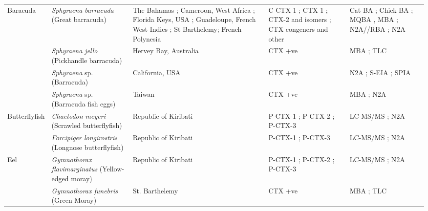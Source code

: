 \documentclass[12pt]{article}
\begin{document}
\begin{longtable}[l]{ | p{2cm} | p{3cm} | p{4.5cm} | p{2cm} | p{3cm} | }
	\hline
	Baracuda & \emph{Sphyraena barracuda} (Great barracuda) & The Bahamas \cite{o2012linking}; Cameroon, West Africa \cite{bienfang2008ciguatera}; Florida Keys, USA \cite{dechraoui2005use}; Guadeloupe, French West Indies \cite{pottier2003identification,pottier2001ciguatera}; St Barthelemy\cite{pottier2001ciguatera,vernoux1986heterogeneity}; French Polynesia \cite{bagnis1987use,chinain2014mail} & C-CTX-1 \cite{dechraoui2005use,pottier2003identification}; CTX-1 \cite{pottier2003identification}; CTX-2 and isomers \cite{pottier2003identification}; CTX congeners and other \cite{pottier2003identification}& Cat BA \cite{bagnis1987use}; Chick BA \cite{pottier2001ciguatera}; MQBA \cite{bagnis1987use}, MBA \cite{bagnis1987use,pottier2002characterisation,pottier2003identification}; N2A//RBA \cite{chinain2014mail}; N2A \cite{o2012linking} \\
	& \emph{Sphyraena jello} (Pickhandle barracuda) & Hervey Bay, Australia \cite{lewis1984ciguatoxin} & CTX +ve \cite{lewis1984ciguatoxin} & MBA \cite{lewis1984ciguatoxin}; TLC \cite{lewis1984ciguatoxin} \\
	& \emph{Sphyraena} sp. (Barracuda) & California, USA \cite{hokama1990simplified} & CTX +ve \cite{hokama1990simplified} & N2A \cite{hokama1990simplified}; S-EIA \cite{hokama1990simplified}; SPIA \cite{hokama1990simplified} \\
	& \emph{Sphyraena} sp. (Barracuda fish eggs) & Taiwan \cite{hung2005persistent} & CTX +ve \cite{hung2005persistent} & MBA \cite{hung2005persistent}; N2A \cite{hung2005persistent} \\
	\hline
	Butterflyfish & \emph{Chaetodon meyeri} (Scrawled butterflyfish) & Republic of Kiribati \cite{mak2013pacific} & P-CTX-1 \cite{mak2013pacific}; P-CTX-2 \cite{mak2013pacific}; P-CTX-3 \cite{mak2013pacific} & LC-MS/MS \cite{mak2013pacific}; N2A \cite{mak2013pacific} \\
	 & \emph{Forcipiger longirostris} (Longnose butterflyfish) & Republic of Kiribati \cite{mak2013pacific} & P-CTX-1 \cite{mak2013pacific}; P-CTX-3 \cite{mak2013pacific} & LC-MS/MS \cite{mak2013pacific}; N2A \cite{mak2013pacific} \\
	 \hline
	Eel & \emph{Gymnothorax flavimarginatus} (Yellow-edged moray) & Republic of Kiribati \cite{mak2013pacific} & P-CTX-1 \cite{mak2013pacific}; P-CTX-2 \cite{mak2013pacific}; P-CTX-3 \cite{mak2013pacific} & LC-MS/MS \cite{mak2013pacific}; N2A \cite{mak2013pacific} \\
	& \emph{Gymnothorax funebris} (Green Moray) & St. Barthelemy \cite{vernoux1986heterogeneity} & CTX +ve \cite{vernoux1986heterogeneity} & MBA \cite{vernoux1986heterogeneity}; TLC \cite{vernoux1986heterogeneity} \\

\end{longtable}
\end{document}
